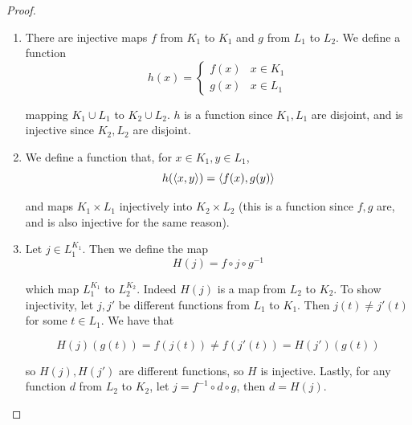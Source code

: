 \begin{proof}
    \begin{enumerate}[label=(\alph*)]
        \item There are injective maps $f$ from $K_1$ to $K_1$ and $g$ from $L_1$ to $L_2$. We define a function 
        \[h(x) = \begin{cases}
            f(x) & x \in K_1 \\ g(x) & x \in L_1
        \end{cases}\]

        mapping $K_1 \cup L_1$ to $K_2 \cup L_2$. $h$ is a function since $K_1, L_1$ are disjoint, and is injective since $K_2,L_2$ are disjoint. 

        \item We define a function that, for $x \in K_1, y \in L_1$,
        \[h(\left\langle x,y \right\rangle) = \left\langle f(x),g(y) \right\rangle\]

        and maps $K_1 \times L_1$ injectively into $K_2 \times L_2$ (this is a function since $f,g$ are, and is also injective for the same reason).

        \item Let $j \in L_1^{K_1}$. Then we define the map 
        \[H(j) = f \circ j \circ g^{-1}\]

        which map $L_1^{K_1}$ to $L_2^{K_2}$. Indeed $H(j)$ is a map from $L_2$ to $K_2$. To show injectivity, let $j,j'$ be different functions from $L_1$ to $K_1$. Then $j(t) \neq j'(t)$ for some $t \in L_1$. We have that 

        \[H(j)(g(t)) = f(j(t)) \neq f(j'(t)) = H(j')(g(t))\]

        so $H(j), H(j')$ are different functions, so $H$ is injective. Lastly, for any function $d$ from $L_2$ to $K_2$, let $j = f^{-1} \circ d \circ g$, then $d = H(j)$.
    \end{enumerate}
\end{proof}

